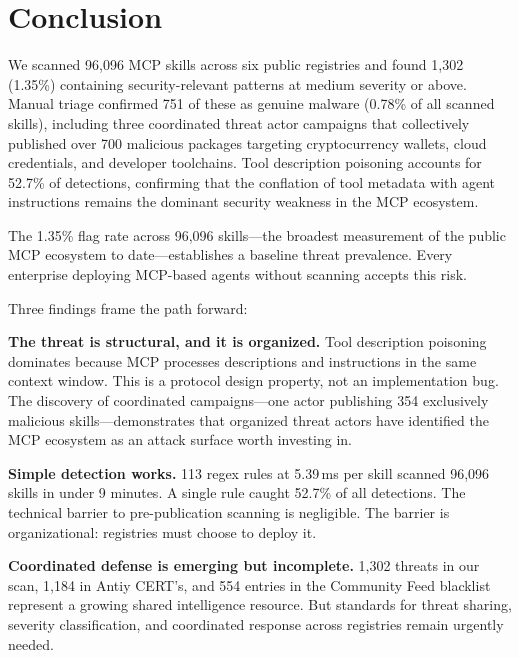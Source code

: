 \documentclass[letterpaper,twocolumn,10pt]{article}
\begin{document}
\section{Conclusion}
\label{sec:conclusion}

We scanned 96,096 MCP skills across six public registries and found
1,302 (1.35\%) containing security-relevant patterns at medium severity
or above.  Manual triage confirmed 751 of these as genuine malware
(0.78\% of all scanned skills), including three coordinated threat actor
campaigns that collectively published over 700 malicious packages
targeting cryptocurrency wallets, cloud credentials, and developer
toolchains.  Tool description poisoning accounts for 52.7\% of
detections, confirming that the conflation of tool metadata with agent
instructions remains the dominant security weakness in the MCP ecosystem.

The 1.35\% flag rate across 96,096 skills---the broadest measurement of
the public MCP ecosystem to date---establishes a baseline threat
prevalence.  Every enterprise deploying MCP-based agents without scanning
accepts this risk.

Three findings frame the path forward:

\textbf{The threat is structural, and it is organized.}  Tool description
poisoning dominates because MCP processes descriptions and instructions
in the same context window.  This is a protocol design property, not an
implementation bug.  The discovery of coordinated campaigns---one actor
publishing 354 exclusively malicious skills---demonstrates that
organized threat actors have identified the MCP ecosystem as an attack
surface worth investing in.

\textbf{Simple detection works.}  113 regex rules at 5.39\,ms per skill
scanned 96,096 skills in under 9 minutes.  A single rule caught 52.7\%
of all detections.  The technical barrier to pre-publication scanning is
negligible.  The barrier is organizational: registries must choose to
deploy it.

\textbf{Coordinated defense is emerging but incomplete.}  1,302 threats
in our scan, 1,184 in Antiy CERT's, and 554 entries in the Community Feed
blacklist represent a growing shared intelligence resource.  But
standards for threat sharing, severity classification, and coordinated
response across registries remain urgently needed.
\end{document}
